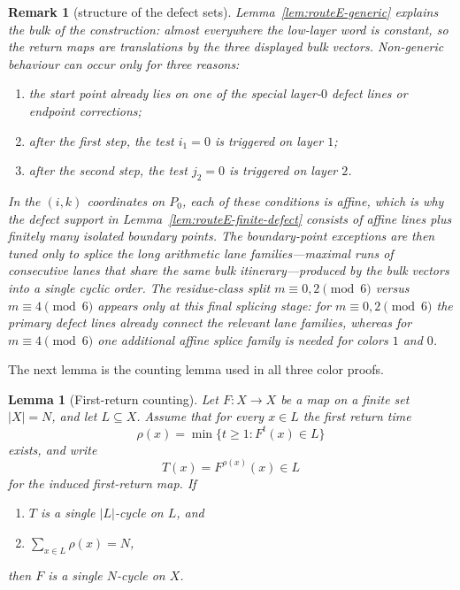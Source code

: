\documentclass[11pt]{article}
\newtheorem{lemma}{Lemma}
\newtheorem{remark}{Remark}
\begin{document}
\begin{remark}[structure of the defect sets]\label{rem:routeE-design}
Lemma~\ref{lem:routeE-generic} explains the bulk of the construction: almost everywhere the low-layer word is constant, so the return maps are translations by the three displayed bulk vectors.
Non-generic behaviour can occur only for three reasons:
\begin{enumerate}[label=\textup{(\alph*)},leftmargin=2em]
\item the start point already lies on one of the special layer-$0$ defect lines or endpoint corrections;
\item after the first step, the test $i_1=0$ is triggered on layer $1$;
\item after the second step, the test $j_2=0$ is triggered on layer $2$.
\end{enumerate}
In the $(i,k)$ coordinates on $P_0$, each of these conditions is affine, which is why the defect support in Lemma~\ref{lem:routeE-finite-defect} consists of affine lines plus finitely many isolated boundary points.
The boundary-point exceptions are then tuned only to splice the long arithmetic \emph{lane families}---maximal runs of consecutive lanes that share the same bulk itinerary---produced by the bulk vectors into a single cyclic order.
The residue-class split $m\equiv 0,2\pmod{6}$ versus $m\equiv 4\pmod{6}$ appears only at this final splicing stage: for $m\equiv 0,2\pmod{6}$ the primary defect lines already connect the relevant lane families, whereas for $m\equiv 4\pmod{6}$ one additional affine splice family is needed for colors $1$ and $0$.
\end{remark}

The next lemma is the counting lemma used in all three color proofs.

\begin{lemma}[First-return counting]\label{lem:counting}
Let $F:X\to X$ be a map on a finite set $|X|=N$, and let $L\subseteq X$.
Assume that for every $x\in L$ the first return time
\[
\rho(x)=\min\{t\ge 1:F^t(x)\in L\}
\]
exists, and write
\[
T(x)=F^{\rho(x)}(x)\in L
\]
for the induced first-return map.
If
\begin{enumerate}[label=\textup{(\roman*)}]
\item $T$ is a single $|L|$-cycle on $L$, and
\item $\sum_{x\in L}\rho(x)=N$,
\end{enumerate}
then $F$ is a single $N$-cycle on $X$.
\end{lemma}
\end{document}

